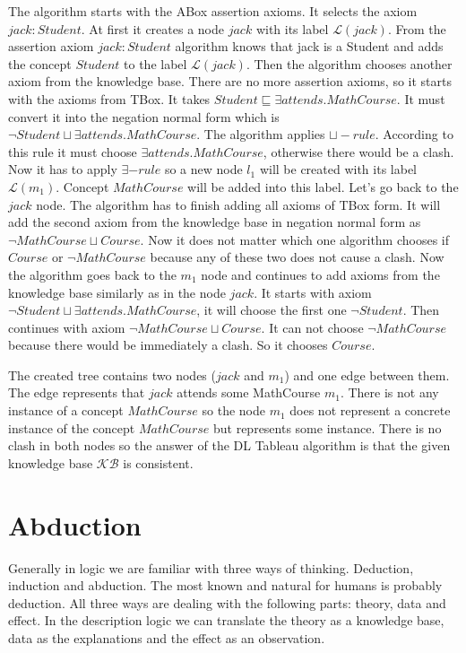 \documentclass[12pt,a4paper]{article}
\begin{document}
The algorithm starts with the ABox assertion axioms. It selects the axiom $jack : Student$. At first it creates a node $jack$ with its label $\mathcal{L}(jack)$. From the assertion axiom $jack : Student$ algorithm knows that jack is a Student and adds the concept $Student$ to the label $\mathcal{L}(jack)$. Then the algorithm chooses another axiom from the knowledge base. There are no more assertion axioms, so it starts with the axioms from TBox. It takes $Student \sqsubseteq \exists attends.MathCourse$. It must convert it into the negation normal form which is $\neg Student \sqcup \exists attends.MathCourse$. The algorithm applies $\sqcup-rule$. According to this rule it must choose $\exists attends.MathCourse$, otherwise there would be a clash. Now it has to apply $\exists - rule$ so a new node $l_{1}$ will be created with its label $\mathcal{L}(m_{1})$. Concept $MathCourse$ will be added into this label. Let's go back to the $jack$ node. The algorithm has to finish adding all axioms of TBox form. It will add the second axiom from the knowledge base in negation normal form as $\neg MathCourse \sqcup Course$. Now it does not matter which one algorithm chooses if $Course$ or $\neg MathCourse$ because any of these two does not cause a clash. Now the algorithm goes back to the $m_{1}$ node and continues to add axioms from the knowledge base similarly as in the node $jack$. It starts with axiom $\neg Student \sqcup \exists attends.MathCourse$, it will choose the first one $\neg Student$. Then continues with axiom $\neg MathCourse \sqcup Course$. It can not choose $\neg MathCourse$ because there would be immediately a clash. So it chooses $Course$.

The created tree contains two nodes ($jack$ and $m_{1}$) and one edge between them. The edge represents that $jack$ attends some MathCourse $m_{1}$. There is not any instance of a concept $MathCourse$ so the node $m_{1}$ does not represent a concrete instance of the concept $MathCourse$ but represents some instance. There is no clash in both nodes so the answer of the DL Tableau algorithm is that the given knowledge base $\mathcal{KB}$ is consistent.

\pagebreak
\section{Abduction}
Generally in logic we are familiar with three ways of thinking. Deduction, induction and abduction. The most known and natural for humans is probably deduction. All three ways are dealing with the following parts: theory, data and effect. In the description logic we can translate the theory as a knowledge base, data as the explanations and the effect as an observation.
\end{document}
